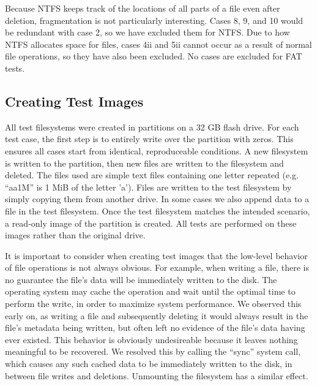 Because NTFS keeps track of the locations of all parts of a file even after deletion, fragmentation is not particularly interesting. Cases 8, 9, and 10 would be redundant with case 2, so we have excluded them for NTFS. Due to how NTFS allocates space for files, cases 4ii and 5ii cannot occur as a result of normal file operations, so they have also been excluded. No cases are excluded for FAT tests.

\subsection{Creating Test Images}
All test filesystems were created in partitions on a 32 GB flash drive. For each test case, the first step is to entirely write over the partition with zeros. This ensures all cases start from identical, reproduceable conditions. A new filesystem is written to the partition, then new files are written to the filesystem and deleted. The files used are simple text files containing one letter repeated (e.g. ``aa1M'' is 1 MiB of the letter 'a'). Files are written to the test filesystem by simply copying them from another drive. In some cases we also append data to a file in the test filesystem. Once the test filesystem matches the intended scenario, a read-only image of the partition is created. All tests are performed on these images rather than the original drive.

It is important to consider when creating test images that the low-level behavior of file operations is not always obvious. For example, when writing a file, there is no guarantee the file's data will be immediately written to the disk. The operating system may cache the operation and wait until the optimal time to perform the write, in order to maximize system performance. We observed this early on, as writing a file and subsequently deleting it would always result in the file's metadata being written, but often left no evidence of the file's data having ever existed. This behavior is obviously undesireable because it leaves nothing meaningful to be recovered. We resolved this by calling the ``sync'' system call, which causes any such cached data to be immediately written to the disk, in between file writes and deletions. Unmounting the filesystem has a similar effect.

